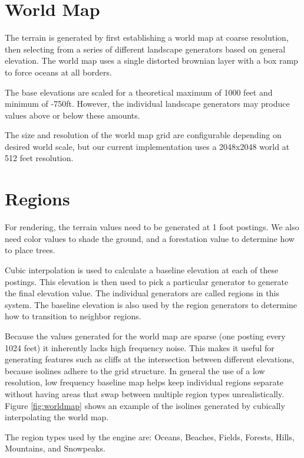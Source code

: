 \section{World Map} \label{sec:worldmap}

The terrain is generated by first establishing a world map at coarse resolution, then selecting from a series of different landscape generators based on general elevation.
The world map uses a single distorted brownian layer with a box ramp to force oceans at all borders.

The base elevations are scaled for a theoretical maximum of 1000 feet and minimum of -750ft.
However, the individual landscape generators may produce values above or below these amounts.

The size and resolution of the world map grid are configurable depending on desired world scale, but our current implementation uses a 2048x2048 world at 512 feet resolution.

\section{Regions} \label{sec:region}

For rendering, the terrain values need to be generated at 1 foot postings.
We also need color values to shade the ground, and a forestation value to determine how to place trees.

Cubic interpolation is used to calculate a baseline elevation at each of these postings.
This elevation is then used to pick a particular generator to generate the final elevation value.
The individual generators are called regions in this system.
The baseline elevation is also used by the region generators to determine how to transition to neighbor regions.

Because the values generated for the world map are sparse (one posting every 1024 feet) it inherently lacks high frequency noise.
This makes it useful for generating features such as cliffs at the intersection between different elevations, because isolines adhere to the grid structure.
In general the use of a low resolution, low frequency baseline map helps keep individual regions separate without having areas that swap between multiple region types unrealistically.
Figure \ref{fig:worldmap} shows an example of the isolines generated by cubically interpolating the world map.

The region types used by the engine are: Oceans, Beaches, Fields, Forests, Hills, Mountains, and Snowpeaks.

